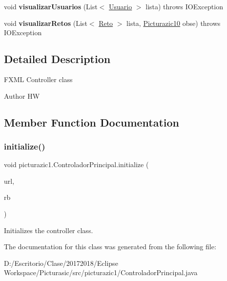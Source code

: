 \begin{DoxyCompactItemize}
\mbox{\label{classpicturazic1_1_1_controlador_principal_a40b14259c066a2db168f6f2e7392b63b}} 
void {\bfseries visualizar\+Usuarios} (List$<$ \mbox{\hyperlink{classmodelo_1_1_usuario}{Usuario}} $>$ lista)  throws I\+O\+Exception 
\item 
\mbox{\label{classpicturazic1_1_1_controlador_principal_a3be9dac836f03754f365e4b221b540e3}} 
void {\bfseries visualizar\+Retos} (List$<$ \mbox{\hyperlink{classmodelo_1_1_reto}{Reto}} $>$ lista, \mbox{\hyperlink{classpicturazic1_1_1_picturazic10}{Picturazic10}} obse)  throws I\+O\+Exception 
\end{DoxyCompactItemize}


\subsection{Detailed Description}
F\+X\+ML Controller class

\begin{DoxyAuthor}{Author}
HW 
\end{DoxyAuthor}


\subsection{Member Function Documentation}
\mbox{\label{classpicturazic1_1_1_controlador_principal_aceb559cae1605639bcf18d28c48fa738}} 
\subsubsection{\texorpdfstring{initialize()}{initialize()}}
{\footnotesize\ttfamily void picturazic1.\+Controlador\+Principal.\+initialize (\begin{DoxyParamCaption}\item[{U\+RL}]{url,  }\item[{Resource\+Bundle}]{rb }\end{DoxyParamCaption})}

Initializes the controller class. 

The documentation for this class was generated from the following file\+:\begin{DoxyCompactItemize}
\item 
D\+:/\+Escritorio/\+Clase/20172018/\+Eclipse Workspace/\+Picturasic/src/picturazic1/Controlador\+Principal.\+java\end{DoxyCompactItemize}
